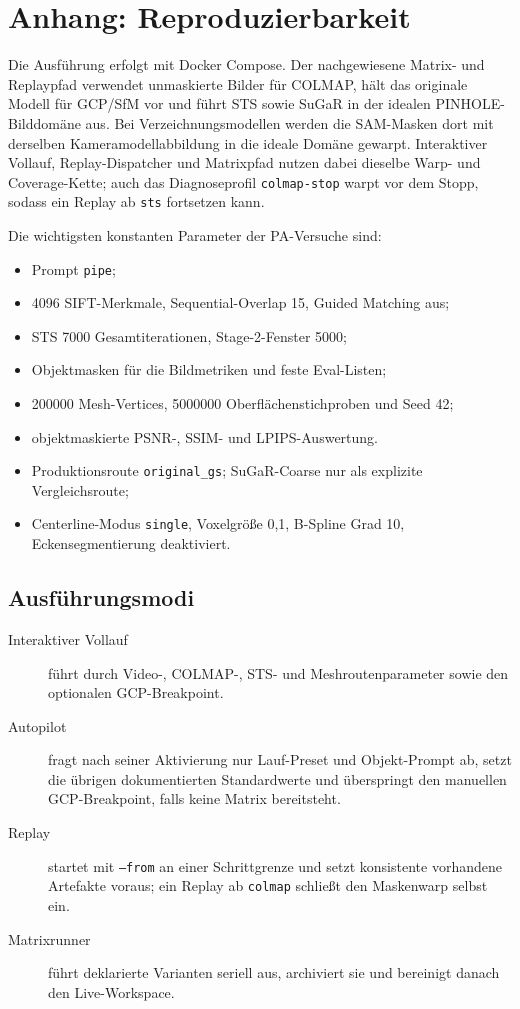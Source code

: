 \section{Anhang: Reproduzierbarkeit}

Die Ausführung erfolgt mit Docker Compose. Der nachgewiesene Matrix- und
Replaypfad verwendet unmaskierte Bilder für COLMAP, hält das originale Modell
für GCP/SfM vor und führt STS sowie SuGaR in der idealen PINHOLE-Bilddomäne
aus. Bei Verzeichnungsmodellen werden die SAM-Masken dort mit derselben
Kameramodellabbildung in die ideale Domäne gewarpt. Interaktiver Vollauf,
Replay-Dispatcher und Matrixpfad nutzen dabei dieselbe Warp- und
Coverage-Kette; auch das Diagnoseprofil \texttt{colmap-stop} warpt vor dem
Stopp, sodass ein Replay ab \texttt{sts} fortsetzen kann.

Die wichtigsten konstanten Parameter der PA-Versuche sind:

\begin{itemize}
  \item Prompt \texttt{pipe};
  \item 4096 SIFT-Merkmale, Sequential-Overlap 15, Guided Matching aus;
  \item STS 7000 Gesamtiterationen, Stage-2-Fenster 5000;
  \item Objektmasken für die Bildmetriken und feste Eval-Listen;
  \item 200000 Mesh-Vertices, 5000000 Oberflächenstichproben und Seed 42;
  \item objektmaskierte PSNR-, SSIM- und LPIPS-Auswertung.
    \item Produktionsroute \texttt{original\_gs}; SuGaR-Coarse nur als
      explizite Vergleichsroute;
    \item Centerline-Modus \texttt{single}, Voxelgröße 0,1, B-Spline Grad 10,
      Eckensegmentierung deaktiviert.
\end{itemize}

  \subsection*{Ausführungsmodi}

  \begin{description}
    \item[Interaktiver Vollauf] führt durch Video-, COLMAP-, STS- und
      Meshroutenparameter sowie den optionalen GCP-Breakpoint.
    \item[Autopilot] fragt nach seiner Aktivierung nur Lauf-Preset und
      Objekt-Prompt ab, setzt die übrigen dokumentierten Standardwerte und
      überspringt den manuellen GCP-Breakpoint, falls keine Matrix bereitsteht.
    \item[Replay] startet mit \texttt{--from} an einer Schrittgrenze und setzt
      konsistente vorhandene Artefakte voraus; ein Replay ab
      \texttt{colmap} schließt den Maskenwarp selbst ein.
    \item[Matrixrunner] führt deklarierte Varianten seriell aus, archiviert sie
      und bereinigt danach den Live-Workspace.
  \end{description}

